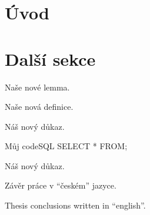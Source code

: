 \documentclass[a4paper,12pt]{article}
\begin{document}
\maketitle

\upthanksanot

\uptocandlists

\section{Úvod}

\section{Další sekce}

\begin{uplemma}
Naše nové lemma.
\end{uplemma}


\begin{uptheorem}
Naše nová  definice.
\end{uptheorem}

\begin{upproof}
Náš nový důkaz.
\end{upproof}

\begin{upcode}{Můj code}{}{SQL}
SELECT * FROM;
\end{upcode}

\begin{upquote}
Náš nový důkaz. 
\end{upquote}

\upendofmainmatter

\begin{upconclusions}[czech]
Závěr práce v \enquote{českém} jazyce.
\end{upconclusions}

\begin{upconclusions}[english]
Thesis conclusions written in \enquote{english}.
\end{upconclusions}

\nocite{*}							%
\upprintbibliography
\end{document}
